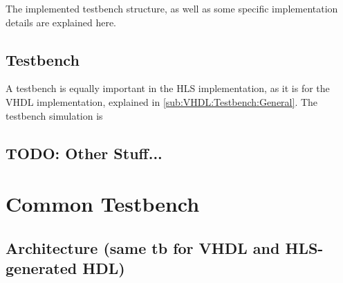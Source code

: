 The implemented testbench structure, as well as some specific implementation details are explained here.

\subsection{Testbench}

A testbench is equally important in the HLS implementation, as it is for the VHDL implementation, explained in \ref{sub:VHDL:Testbench:General}.
The testbench simulation is

\subsection{TODO: Other Stuff...}

\section{Common Testbench}

\subsection{Architecture (same tb for VHDL and HLS-generated HDL)}
